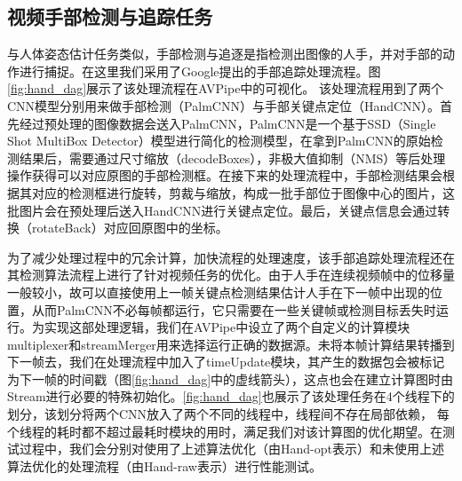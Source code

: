 \subsection{视频手部检测与追踪任务}
与人体姿态估计任务类似，手部检测与追逐是指检测出图像的人手，并对手部的动作进行捕捉。在这里我们采用了Google提出的手部追踪处理流程\cite{mediapipe_hand}。图\ref{fig:hand_dag}展示了该处理流程在AVPipe中的可视化。
该处理流程用到了两个CNN模型分别用来做手部检测（PalmCNN）与手部关键点定位（HandCNN）。首先经过预处理的图像数据会送入PalmCNN，PalmCNN是一个基于SSD（Single Shot MultiBox Detector）\cite{liu2016ssd}模型进行简化的检测模型，在拿到PalmCNN的原始检测结果后，需要通过尺寸缩放（decodeBoxes），非极大值抑制（NMS）等后处理操作获得可以对应原图的手部检测框。在接下来的处理流程中，手部检测结果会根据其对应的检测框进行旋转，剪裁与缩放，构成一批手部位于图像中心的图片，这批图片会在预处理后送入HandCNN进行关键点定位。最后，关键点信息会通过转换（rotateBack）对应回原图中的坐标。\par
为了减少处理过程中的冗余计算，加快流程的处理速度，该手部追踪处理流程还在其检测算法流程上进行了针对视频任务的优化。由于人手在连续视频帧中的位移量一般较小，故可以直接使用上一帧关键点检测结果估计人手在下一帧中出现的位置，从而PalmCNN不必每帧都运行，它只需要在一些关键帧或检测目标丢失时运行。为实现这部处理逻辑，我们在AVPipe中设立了两个自定义的计算模块multiplexer和streamMerger用来选择运行正确的数据源。未将本帧计算结果转播到下一帧去，我们在处理流程中加入了timeUpdate模块，其产生的数据包会被标记为下一帧的时间戳（图\ref{fig:hand_dag}中的虚线箭头），这点也会在建立计算图时由Stream进行必要的特殊初始化。\ref{fig:hand_dag}也展示了该处理任务在4个线程下的划分，该划分将两个CNN放入了两个不同的线程中，线程间不存在局部依赖，
每个线程的耗时都不超过最耗时模块的用时，满足我们对该计算图的优化期望。在测试过程中，我们会分别对使用了上述算法优化（由Hand-opt表示）和未使用上述算法优化的处理流程（由Hand-raw表示）进行性能测试。

